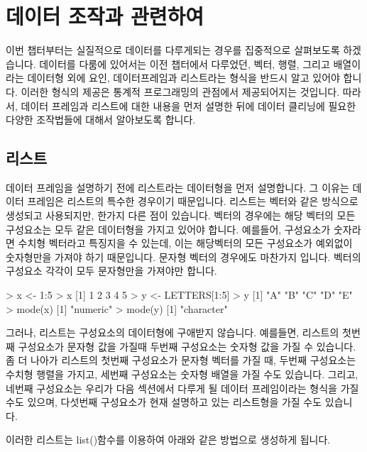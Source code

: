 \documentclass{book}
\begin{document}
%
%
%

\chapter{데이터 조작과 관련하여}

이번 챕터부터는 실질적으로 데이터를 다루게되는 경우를 집중적으로 살펴보도록 하겠습니다.
데이터를 다룸에 있어서는 이전 챕터에서 다루었던, 벡터, 행렬, 그리고 배열이라는 데이터형 외에 요인, 데이터프레임과 리스트라는 형식을 반드시 알고 있어야 합니다.
이러한 형식의 제공은 통계적 프로그래밍의 관점에서 제공되어지는 것입니다. 
따라서, 데이터 프레임과 리스트에 대한 내용을 먼저 설명한 뒤에 데이터 클리닝에 필요한 다양한 조작법들에 대해서 알아보도록 합니다.

\section{리스트}
데이터 프레임을 설명하기 전에 리스트라는 데이터형을 먼저 설명합니다.
그 이유는 데이터 프레임은 리스트의 특수한 경우이기 때문입니다.
리스트는 벡터와 같은 방식으로 생성되고 사용되지만, 한가지 다른 점이 있습니다.
벡터의 경우에는 해당 벡터의 모든 구성요소는 모두 같은 데이터형을 가지고 있어야 합니다.
예를들어, 구성요소가 숫자라면 수치형 벡터라고 특징지을 수 있는데, 이는 해당벡터의 모든 구성요소가 예외없이 숫자형만을 가져야 하기 때문입니다.
문자형 벡터의 경우에도 마찬가지 입니다. 
벡터의 구성요소 각각이 모두 문자형만을 가져야만 합니다.
\begin{Schunk}
\begin{Soutput}
> x <- 1:5
> x
[1] 1 2 3 4 5
> y <- LETTERS[1:5]
> y
[1] "A" "B" "C" "D" "E"
> mode(x)
[1] "numeric"
> mode(y)
[1] "character"
\end{Soutput}
\end{Schunk}

그러나, 리스트는 구성요소의 데이터형에 구애받지 않습니다.
예를들면, 리스트의 첫번째 구성요소가 문자형 값을 가질때 두번째 구성요소는 숫자형 값을 가질 수 있습니다.
좀 더 나아가 리스트의 첫번째 구성요소가 문자형 벡터를 가질 때, 두번째 구성요소는 수치형 행렬을 가지고, 세번째 구성요소는 숫자형 배열을 가질 수도 있습니다.
그리고, 네번째 구성요소는 우리가 다음 섹션에서 다루게 될 데이터 프레임이라는 형식을 가질 수도 있으며, 다섯번째 구성요소가 현재 설명하고 있는 리스트형을 가질 수도 있습니다.

이러한 리스트는 list()함수를 이용하여 아래와 같은 방법으로 생성하게 됩니다.
\end{document}
